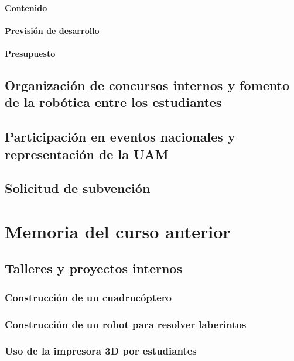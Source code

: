 \documentclass[12pt,twoside]{report}
\begin{document}
\subsubsection{Contenido}
\subsubsection{Previsión de desarrollo}
\subsubsection{Presupuesto}


\section{Organización de concursos internos y fomento de la robótica entre los estudiantes}


\section{Participación en eventos nacionales y representación de la UAM}

\section{Solicitud de subvención}








\chapter{Memoria del curso anterior}

\section{Talleres y proyectos internos}

\subsection{Construcción de un cuadrucóptero}

\subsection{Construcción de un robot para resolver laberintos}

\subsection{Uso de la impresora 3D por estudiantes}
\end{document}
